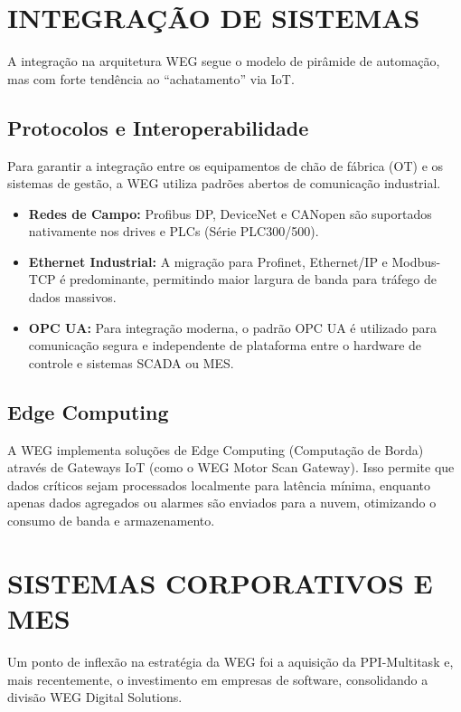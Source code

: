 \documentclass[12pt,a4paper,oneside]{abntex2}
\begin{document}
\chapter{INTEGRAÇÃO DE SISTEMAS}

A integração na arquitetura WEG segue o modelo de pirâmide de automação, mas com forte tendência ao ``achatamento'' via IoT.

\section{Protocolos e Interoperabilidade}

Para garantir a integração entre os equipamentos de chão de fábrica (OT) e os sistemas de gestão, a WEG utiliza padrões abertos de comunicação industrial.

\begin{itemize}
  \item \textbf{Redes de Campo:} Profibus DP, DeviceNet e CANopen são suportados nativamente nos drives e PLCs (Série PLC300/500).
  \item \textbf{Ethernet Industrial:} A migração para Profinet, Ethernet/IP e Modbus-TCP é predominante, permitindo maior largura de banda para tráfego de dados massivos.
  \item \textbf{OPC UA:} Para integração moderna, o padrão OPC UA é utilizado para comunicação segura e independente de plataforma entre o hardware de controle e sistemas SCADA ou MES.
\end{itemize}

\section{Edge Computing}

A WEG implementa soluções de Edge Computing (Computação de Borda) através de Gateways IoT (como o WEG Motor Scan Gateway). Isso permite que dados críticos sejam processados localmente para latência mínima, enquanto apenas dados agregados ou alarmes são enviados para a nuvem, otimizando o consumo de banda e armazenamento.

\chapter{SISTEMAS CORPORATIVOS E MES}

Um ponto de inflexão na estratégia da WEG foi a aquisição da PPI-Multitask e, mais recentemente, o investimento em empresas de software, consolidando a divisão WEG Digital Solutions.
\end{document}
